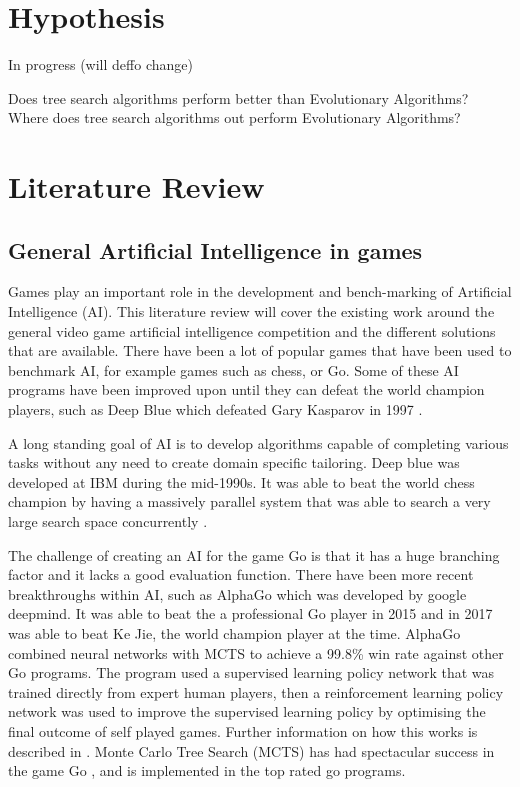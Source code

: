 \documentclass[journal]{IEEEtran}
\begin{document}
\section{Hypothesis}
In progress (will deffo change) \par
Does tree search algorithms perform better than Evolutionary Algorithms?
Where does tree search algorithms out perform Evolutionary Algorithms?

\section{Literature Review}

	\subsection{General Artificial Intelligence in games}
		Games play an important role in the development and bench-marking of Artificial Intelligence (AI). This literature review will cover the existing work around the general video game artificial intelligence competition and the different solutions that are available.
		There have been a lot of popular games that have been used to benchmark AI, for example games such as chess, or Go. Some of these AI programs have been improved upon until they can defeat the world champion players, such as Deep Blue which defeated Gary Kasparov in 1997 \cite{DeepBlue, shannon1988programming, DeepBlueOverview}. 
		
		A long standing goal of AI is to develop algorithms capable of completing various tasks without any need to create domain specific tailoring.
		Deep blue was developed at IBM during the mid-1990s. It was able to beat the world chess champion by having a massively parallel system that was able to search a very large search space concurrently \cite{DeepBlue}.

		The challenge of creating an AI for the game Go is that it has a huge branching factor and it lacks a good evaluation function.
		There have been more recent breakthroughs within AI, such as AlphaGo \cite{silver2016mastering} which was developed by google deepmind. It was able to beat the a professional Go player in 2015 and in 2017 was able to beat Ke Jie, the world champion player at the time\cite{silver2016mastering}.
		AlphaGo combined neural networks with MCTS to achieve a 99.8\% win rate against other Go programs. The program used a supervised learning policy network that was trained directly from expert human players, then a reinforcement learning policy network was used to improve the supervised learning policy by optimising the final outcome of self played games. Further information on how this works is described in \cite{silver2016mastering}.
		Monte Carlo Tree Search (MCTS) has had spectacular success in the game Go \cite{browne2012survey}, and is implemented in the top rated go programs.
\end{document}

